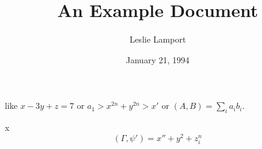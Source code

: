 \documentclass{article}      %
\title{An Example Document}  %
\author{Leslie Lamport}      %
\date{January 21, 1994}      %
\newcommand{\ip}[2]{(#1, #2)}
\begin{document}
like
\pagestyle{empty}
\( x - 3y + z = 7 \)
or
       \( a_{1} > x^{2n} + y^{2n} > x' \)
or  
       \( \ip{A}{B} = \sum_{i} a_{i} b_{i} \).

x
   \[  \ip{\Gamma}{\psi'} = x'' + y^{2} + z_{i}^{n}\]
\end{document}
